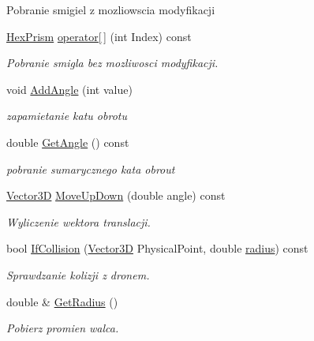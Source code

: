 \begin{DoxyCompactItemize}
\begin{DoxyCompactList}
\begin{DoxyItemize}
\item Pobranie smigiel z mozliowscia modyfikacji 
\end{DoxyItemize}\end{DoxyCompactList}\item 
\hyperlink{class_hex_prism}{Hex\+Prism} \hyperlink{class_quadracopter_a35db9425da009e00a6fc4b0393b0d3fb}{operator\mbox{[}$\,$\mbox{]}} (int Index) const 
\begin{DoxyCompactList}\small\item\em Pobranie smigla bez mozliwosci modyfikacji. \end{DoxyCompactList}\item 
void \hyperlink{class_quadracopter_ac4aedc67a3d57345721978acdec6ee18}{Add\+Angle} (int value)
\begin{DoxyCompactList}\small\item\em zapamietanie katu obrotu \end{DoxyCompactList}\item 
double \hyperlink{class_quadracopter_a1e43b7fba5785f94e451f1510c7be5e1}{Get\+Angle} () const 
\begin{DoxyCompactList}\small\item\em pobranie sumarycznego kata obrout \end{DoxyCompactList}\item 
\hyperlink{vector3_d_8hh_a8790ef07836c1639da216f46501979c0}{Vector3D} \hyperlink{class_quadracopter_a88854bf826c6ee95de12947ae45112cb}{Move\+Up\+Down} (double angle) const 
\begin{DoxyCompactList}\small\item\em Wyliczenie wektora translacji. \end{DoxyCompactList}\item 
bool \hyperlink{class_quadracopter_a27a2a987ddd033cdc774dbdd1a28d153}{If\+Collision} (\hyperlink{vector3_d_8hh_a8790ef07836c1639da216f46501979c0}{Vector3D} Physical\+Point, double \hyperlink{class_quadracopter_a34736716e6c9c1ef8a73dec7e4dc2485}{radius}) const 
\begin{DoxyCompactList}\small\item\em Sprawdzanie kolizji z dronem. \end{DoxyCompactList}\item 
double \& \hyperlink{class_quadracopter_ac511e0187c27f49c0e43bcb1512f0941}{Get\+Radius} ()
\begin{DoxyCompactList}\small\item\em Pobierz promien walca. \end{DoxyCompactList}\item 

\end{DoxyCompactItemize}
